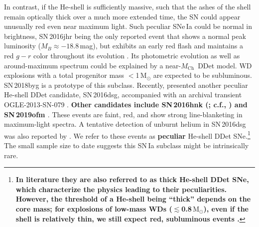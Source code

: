 \documentclass[twocolumn]{aastex631}
\newcommand{\Mch}{$M_\mathrm{Ch}$}
\newcommand{\Msun}{\mathrm{M_\odot}}
\newcommand{\revise}[1]{\textbf{#1}}
\begin{document}
In contrast, if the He-shell is sufficiently massive, such that the ashes of the shell remain optically thick over a much more extended time, the SN could appear unusually red even near maximum light. Such peculiar SNe\,Ia could be normal in brightness, SN\,2016jhr being the only reported event that shows a normal peak luminosity ($M_B\approx-18.8$\,mag), but exhibits an early red flash and maintains a red $g-r$ color throughout its evolution \citep{jiang_16jhr_2017}. Its photometric evolution as well as around-maximum spectrum could be explained by a near-\Mch\ DDet model. %
WD explosions with a total progenitor mass $<$1\,$\mathrm{M_\odot}$ are expected to be subluminous. SN\,2018byg \citep{de_18byg_2019} is a prototype of this subclass. Recently, \citet{Dong_16dsg_2022} presented another peculiar He-shell DDet candidate, SN\,2016dsg, accompanied with an archival transient OGLE-2013-SN-079 \citep{Inserra_OGLE13_079_2015}. \revise{Other candidates include SN\,2016hnk (\citealp{jacobson-galan_16hnk_2020}; c.f., \citealp{galbany_16hnk_2019}) and SN\,2019ofm \citep{de_Ca_rich_2020}}. These events are faint, red, and show strong line-blanketing in maximum-light spectra. A tentative detection of unburnt helium in SN\,2016dsg was also reported by \citet{Dong_16dsg_2022}. We refer to these events as \revise{peculiar} He-shell DDet SNe.\footnote{\revise{In literature they are also referred to as thick He-shell DDet SNe, which characterize the physics leading to their peculiarities. However, the threshold of a He-shell being ``thick'' depends on the core mass; for explosions of low-mass WDs ($\lesssim$0.8\,$\Msun$), even if the shell is relatively thin, we still expect red, subluminous events \citep[e.g.,][]{Shen_2D_2021}.}}
The small sample size to date suggests this SN\,Ia subclass might be intrinsically rare.
\end{document}
